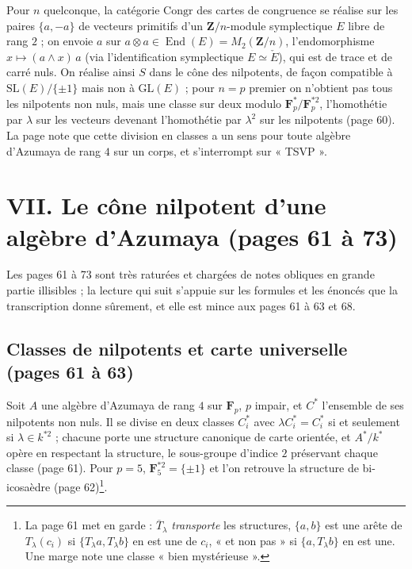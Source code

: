 \documentclass[11pt,a4paper]{article}
\begin{document}
Pour $n$ quelconque, la catégorie $\mathrm{Congr}$ des cartes de congruence se
réalise sur les paires $\{a, -a\}$ de vecteurs primitifs d'un
$\mathbf{Z}/n$-module symplectique $E$ libre de rang $2$ ; on envoie $a$ sur
$a \otimes a \in \operatorname{End}(E) = M_2(\mathbf{Z}/n)$, l'endomorphisme
$x \mapsto (a \wedge x)\,a$ (via l'identification symplectique $E \simeq
\check{E}$), qui est de trace et de carré nuls. On réalise ainsi $S$ dans le
cône des nilpotents, de façon compatible à $\mathrm{SL}(E)/\{\pm 1\}$ mais non
à $\mathrm{GL}(E)$ ; pour $n = p$ premier on n'obtient pas tous les nilpotents
non nuls, mais une classe sur deux modulo $\mathbf{F}_p^{*}/\mathbf{F}_p^{*2}$,
l'homothétie par $\lambda$ sur les vecteurs devenant l'homothétie par
$\lambda^2$ sur les nilpotents (page 60). La page note que cette division en
classes a un sens pour toute algèbre d'Azumaya de rang $4$ sur un corps, et
s'interrompt sur « TSVP ».

\section*{VII. Le cône nilpotent d'une algèbre d'Azumaya (pages 61 à 73)}

Les pages 61 à 73 sont très raturées et chargées de notes obliques en grande
partie illisibles ; la lecture qui suit s'appuie sur les formules et les
énoncés que la transcription donne sûrement, et elle est mince aux pages 61
à 63 et 68.

\subsection*{Classes de nilpotents et carte universelle (pages 61 à 63)}

Soit $A$ une algèbre d'Azumaya de rang $4$ sur $\mathbf{F}_p$, $p$ impair, et
$C^{*}$ l'ensemble de ses nilpotents non nuls. Il se divise en deux classes
$C^{*}_i$ avec $\lambda C^{*}_i = C^{*}_i$ si et seulement si $\lambda \in
k^{*2}$ ; chacune porte une structure canonique de carte orientée, et
$A^{*}/k^{*}$ opère en respectant la structure, le sous-groupe d'indice $2$
préservant chaque classe (page 61). Pour $p = 5$, $\mathbf{F}_5^{*2} = \{\pm 1\}$
et l'on retrouve la structure de bi-icosaèdre (page 62)\footnote{La page 61
met en garde : $\overline{T}_\lambda$ \emph{transporte} les structures, $\{a,
b\}$ est une arête de $T_\lambda(c_i)$ si $\{T_\lambda a, T_\lambda b\}$ en est
une de $c_i$, « et non pas » si $\{a, T_\lambda b\}$ en est une. Une marge
note une classe « bien mystérieuse ».}.
\end{document}
